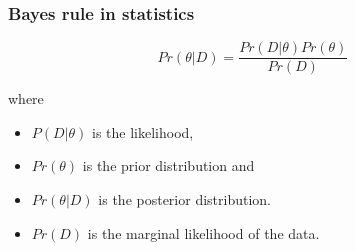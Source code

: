 \begin{frame}
\frametitle{Bayes rule in statistics}

\LARGE{
\[
Pr(\theta|D) = \frac{Pr(D|\theta)Pr(\theta)}{Pr(D)} \quad %
\]
}

\normalsize{
where 

\begin{itemize}
\item $P(D|\theta)$ is the \alert{likelihood}, 
\item $Pr(\theta)$ is the \alert{prior} distribution and
\item $Pr(\theta|D)$ is the \alert{posterior} distribution.
\item $Pr(D)$ is the \alert{marginal likelihood} of the data.
\end{itemize}
}

\end{frame}

